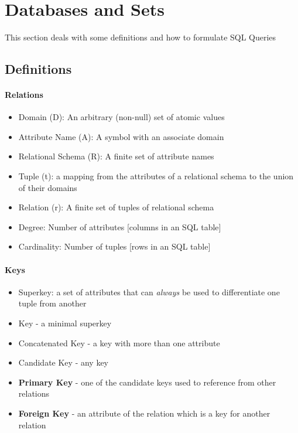\section{Databases and Sets}
This section deals with some definitions and how to formulate SQL Queries
\subsection{Definitions}
\paragraph{Relations}
\begin{itemize}
	\item Domain (D): An arbitrary (non-null) set of atomic values
	\item Attribute Name (A): A symbol with an associate domain
	\item Relational Schema (R): A finite set of attribute names
	\item Tuple (t): a mapping from the attributes of a relational schema to the union of their domains
	\item Relation (r): A finite set of tuples of relational schema
	\item Degree: Number of attributes [columns in an SQL table]
	\item Cardinality: Number of tuples [rows in an SQL table]
\end{itemize}
\paragraph{Keys}
\begin{itemize}
	\item Superkey: a set of attributes that can \textit{always} be used to differentiate one tuple from another
	\item Key - a minimal superkey
	\item Concatenated Key -  a key with more than one attribute
	\item Candidate Key - any key
	\item \textbf{Primary Key} - one of the candidate keys used to reference from other relations
	\item \textbf{Foreign Key} - an attribute of the relation which is a key for another relation
\end{itemize}
